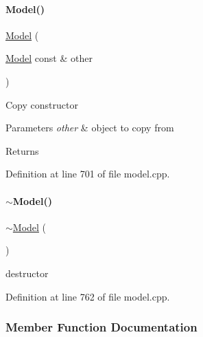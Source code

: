\paragraph{\texorpdfstring{Model()}{Model()}\hspace{0.1cm}{\footnotesize\ttfamily [3/3]}}
{\footnotesize\ttfamily \mbox{\hyperlink{classamici_1_1_model}{Model}} (\begin{DoxyParamCaption}\item[{\mbox{\hyperlink{classamici_1_1_model}{Model}} const \&}]{other }\end{DoxyParamCaption})}

Copy constructor 
\begin{DoxyParams}{Parameters}
{\em other} & object to copy from \\
\hline
\end{DoxyParams}
\begin{DoxyReturn}{Returns}

\end{DoxyReturn}


Definition at line 701 of file model.\+cpp.

\mbox{\label{classamici_1_1_model_a252c349b237f7779edf32778eb541a99}} 
\paragraph{\texorpdfstring{$\sim$\+Model()}{~Model()}}
{\footnotesize\ttfamily $\sim$\mbox{\hyperlink{classamici_1_1_model}{Model}} (\begin{DoxyParamCaption}{ }\end{DoxyParamCaption})\hspace{0.3cm}{\ttfamily [virtual]}}

destructor 

Definition at line 762 of file model.\+cpp.



\subsubsection{Member Function Documentation}
\mbox{\label{classamici_1_1_model_abcf360cf2836a5c7a7686a6a5c0c6bfa}} 
